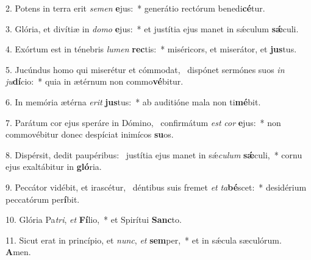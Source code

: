 2. Potens in terra erit \textit{se}\textit{men} \textbf{e}jus:~*  generátio rectórum benedi\textbf{cé}tur.\

3. Glória, et divítiæ in \textit{do}\textit{mo} \textbf{e}jus:~*  et justítia ejus manet in sǽculum \textbf{sǽ}culi.\

4. Exórtum est in ténebris \textit{lu}\textit{men} \textbf{rec}tis:~*  miséricors, et miserátor, et \textbf{jus}tus.\

5. Jucúndus homo qui miserétur et cómmodat, \dag\  dispónet sermónes suos \textit{in} \textit{ju}\textbf{dí}cio:~*  quia in ætérnum non commo\textbf{vé}bitur.\

6. In memória ætérna \textit{e}\textit{rit} \textbf{jus}tus:~*  ab auditióne mala non ti\textbf{mé}bit.\

7. Parátum cor ejus speráre in Dómino, \dag\  confirmátum \textit{est} \textit{cor} \textbf{e}jus:~*  non commovébitur donec despíciat inimícos \textbf{su}os.\

8. Dispérsit, dedit paupéribus: \dag\  justítia ejus manet in sǽ\textit{cu}\textit{lum} \textbf{sǽ}culi,~*  cornu ejus exaltábitur in \textbf{gló}ria.\

9. Peccátor vidébit, et irascétur, \dag\  déntibus suis fremet \textit{et} \textit{ta}\textbf{bé}scet:~*  desidérium peccatórum per\textbf{í}bit.\

10. Glória Pa\textit{tri}, \textit{et} \textbf{Fí}lio,~*  et Spirítui \textbf{Sanc}to.\

11. Sicut erat in princípio, et \textit{nunc}, \textit{et} \textbf{sem}per,~*  et in sǽcula sæculórum. \textbf{A}men.\

